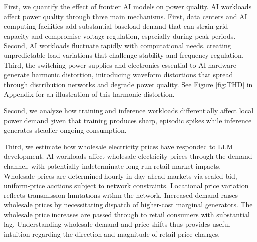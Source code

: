 \documentclass[sigconf,authordraft]{acmart}
\begin{document}
First, we quantify the effect of frontier AI models on power quality. %
AI workloads affect power quality through three main mechanisms. First, data centers and AI computing facilities add substantial baseload demand that can strain grid capacity and compromise voltage regulation, especially during peak periods. Second, AI workloads fluctuate rapidly with computational needs, creating unpredictable load variations that challenge stability and frequency regulation. Third, the switching power supplies and electronics essential to AI hardware generate harmonic distortion, introducing waveform distortions that spread through distribution networks and degrade power quality. See Figure \ref{fig:THD} in Appendix for an illustration of this harmonic distortion.



Second, we analyze how training and inference workloads differentially affect local power demand given that training produces sharp, episodic spikes while inference generates steadier ongoing consumption. 

Third, we estimate how wholesale electricity prices have responded to LLM development. %
AI workloads  affect wholesale electricity prices through the demand channel, with potentially indeterminate long-run retail market impacts. %
Wholesale prices are determined hourly in day-ahead markets via sealed-bid, uniform-price auctions subject to network constraints. Locational price variation reflects transmission limitations within the network. Increased demand raises wholesale prices by necessitating dispatch of higher-cost marginal generators. The wholesale price increases are passed through to retail consumers with substantial lag. Understanding wholesale demand and price shifts thus provides useful intuition regarding the direction and magnitude of retail price changes.
\end{document}
